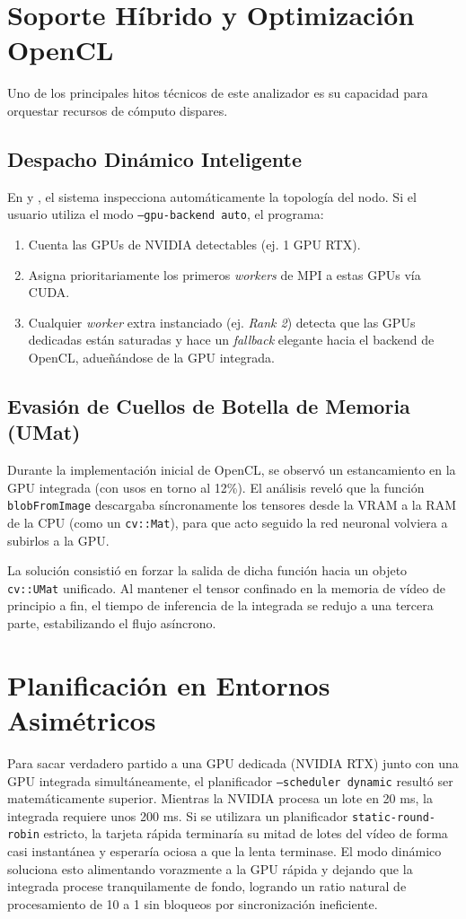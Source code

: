 \documentclass[11pt,a4paper]{article}
\begin{document}
\section{Soporte H\'ibrido y Optimizaci\'on OpenCL}
Uno de los principales hitos t\'ecnicos de este analizador es su capacidad para orquestar recursos de c\'omputo dispares.

\subsection{Despacho Din\'amico Inteligente}
En  y , el sistema inspecciona autom\'aticamente la topolog\'ia del nodo. Si el usuario utiliza el modo \texttt{--gpu-backend auto}, el programa:
\begin{enumerate}
    \item Cuenta las GPUs de NVIDIA detectables (ej. 1 GPU RTX).
    \item Asigna prioritariamente los primeros \emph{workers} de MPI a estas GPUs v\'ia CUDA.
    \item Cualquier \emph{worker} extra instanciado (ej. \emph{Rank 2}) detecta que las GPUs dedicadas est\'an saturadas y hace un \emph{fallback} elegante hacia el backend de OpenCL, adue\~n\'andose de la GPU integrada.
\end{enumerate}

\subsection{Evasi\'on de Cuellos de Botella de Memoria (UMat)}
Durante la implementaci\'on inicial de OpenCL, se observ\'o un estancamiento en la GPU integrada (con usos en torno al 12\%). El an\'alisis revel\'o que la funci\'on \texttt{blobFromImage} descargaba s\'incronamente los tensores desde la VRAM a la RAM de la CPU (como un \texttt{cv::Mat}), para que acto seguido la red neuronal volviera a subirlos a la GPU. 

La soluci\'on consisti\'o en forzar la salida de dicha funci\'on hacia un objeto \texttt{cv::UMat} unificado. Al mantener el tensor confinado en la memoria de v\'ideo de principio a fin, el tiempo de inferencia de la integrada se redujo a una tercera parte, estabilizando el flujo as\'incrono.

\section{Planificaci\'on en Entornos Asim\'etricos}
Para sacar verdadero partido a una GPU dedicada (NVIDIA RTX) junto con una GPU integrada simult\'aneamente, el planificador \texttt{--scheduler dynamic} result\'o ser matem\'aticamente superior.
Mientras la NVIDIA procesa un lote en 20 ms, la integrada requiere unos 200 ms. Si se utilizara un planificador \texttt{static-round-robin} estricto, la tarjeta r\'apida terminar\'ia su mitad de lotes del v\'ideo de forma casi instant\'anea y esperar\'ia ociosa a que la lenta terminase. El modo din\'amico soluciona esto alimentando vorazmente a la GPU r\'apida y dejando que la integrada procese tranquilamente de fondo, logrando un ratio natural de procesamiento de 10 a 1 sin bloqueos por sincronizaci\'on ineficiente.
\end{document}
